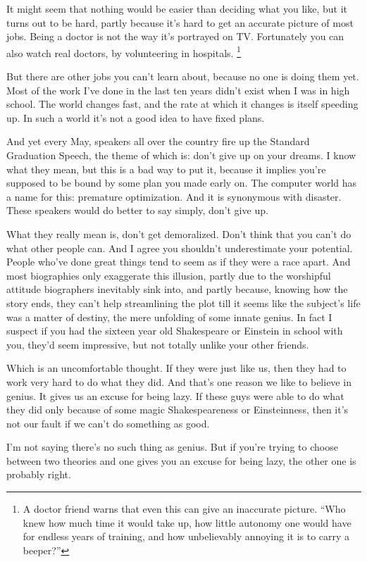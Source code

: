 \documentclass[12pt]{book}
\begin{document}
It might seem that nothing would be easier than deciding what you like,
but it turns out to be hard, partly because it's hard to get an accurate
picture of most jobs. Being a doctor is not the way it's portrayed on
TV. Fortunately you can also watch real doctors, by volunteering in
hospitals. \footnote{A doctor friend warns that even this can give an inaccurate
picture. ``Who knew how much time it would take up, how little autonomy
one would have for endless years of training, and how unbelievably
annoying it is to carry a beeper?''}

But there are other jobs you can't learn about, because no one is doing
them yet. Most of the work I've done in the last ten years didn't exist
when I was in high school. The world changes fast, and the rate at which
it changes is itself speeding up. In such a world it's not a good idea
to have fixed plans.

And yet every May, speakers all over the country fire up the Standard
Graduation Speech, the theme of which is: don't give up on your dreams.
I know what they mean, but this is a bad way to put it, because it
implies you're supposed to be bound by some plan you made early on. The
computer world has a name for this: premature optimization. And it is
synonymous with disaster. These speakers would do better to say simply,
don't give up.

What they really mean is, don't get demoralized. Don't think that you
can't do what other people can. And I agree you shouldn't underestimate
your potential. People who've done great things tend to seem as if they
were a race apart. And most biographies only exaggerate this illusion,
partly due to the worshipful attitude biographers inevitably sink into,
and partly because, knowing how the story ends, they can't help
streamlining the plot till it seems like the subject's life was a matter
of destiny, the mere unfolding of some innate genius. In fact I suspect
if you had the sixteen year old Shakespeare or Einstein in school with
you, they'd seem impressive, but not totally unlike your other friends.

Which is an uncomfortable thought. If they were just like us, then they
had to work very hard to do what they did. And that's one reason we like
to believe in genius. It gives us an excuse for being lazy. If these
guys were able to do what they did only because of some magic
Shakespeareness or Einsteinness, then it's not our fault if we can't do
something as good.

I'm not saying there's no such thing as genius. But if you're trying to
choose between two theories and one gives you an excuse for being lazy,
the other one is probably right.
\end{document}
